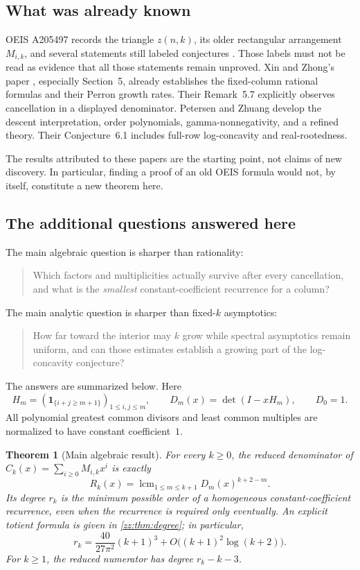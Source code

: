 \documentclass[11pt,a4paper]{article}
\newtheorem{theorem}{Theorem}[section]
\theoremstyle{definition}
\DeclareMathOperator{\lcm}{lcm}
\begin{document}
\subsection{What was already known}
OEIS A205497 records the triangle $z(n,k)$, its older rectangular arrangement
$M_{i,k}$, and several statements still labeled conjectures \cite{oeis205497}.
Those labels must not be read as evidence that all those statements remain
unproved.  Xin and Zhong's paper \cite{xz}, especially Section~5, already
establishes the fixed-column rational formulas and their Perron growth rates.
Their Remark~5.7 explicitly observes cancellation in a displayed denominator.
Petersen and Zhuang \cite{pz} develop the descent interpretation, order
polynomials, gamma-nonnegativity, and a refined theory.  Their
Conjecture~6.1 includes full-row log-concavity and real-rootedness.

The results attributed to these papers are the starting point, not claims of
new discovery.  In particular, finding a proof of an old OEIS formula would
not, by itself, constitute a new theorem here.

\subsection{The additional questions answered here}
The main algebraic question is sharper than rationality:
\begin{quote}
Which factors and multiplicities actually survive after every cancellation,
and what is the \emph{smallest} constant-coefficient recurrence for a column?
\end{quote}
The main analytic question is sharper than fixed-$k$ asymptotics:
\begin{quote}
How far toward the interior may $k$ grow while spectral asymptotics remain
uniform, and can those estimates establish a growing part of the
log-concavity conjecture?
\end{quote}
The answers are summarized below.  Here
\[
 H_m=(\mathbf{1}_{\{i+j\ge m+1\}})_{1\le i,j\le m},\qquad
 D_m(x)=\det(I-xH_m),\qquad D_0=1.
\]
All polynomial greatest common divisors and least common multiples are
normalized to have constant coefficient~$1$.

\begin{theorem}[Main algebraic result]
\label{zz:thm:main-alg}
For every $k\ge0$, the reduced denominator of
$C_k(x)=\sum_{i\ge0}M_{i,k}x^i$ is exactly
\begin{equation}\label{zz:eq:main-lcm}
 R_k(x)=\lcm_{1\le m\le k+1}D_m(x)^{k+2-m}.
\end{equation}
Its degree $r_k$ is the minimum possible order of a homogeneous
constant-coefficient recurrence, even when the recurrence is required only
eventually.  An explicit totient formula is given in
\cref{zz:thm:degree}; in particular,
\begin{equation}\label{zz:eq:main-order}
 r_k=\frac{40}{27\pi^2}(k+1)^3+O\bigl((k+1)^2\log(k+2)\bigr).
\end{equation}
For $k\ge1$, the reduced numerator has degree $r_k-k-3$.
\end{theorem}
\end{document}
